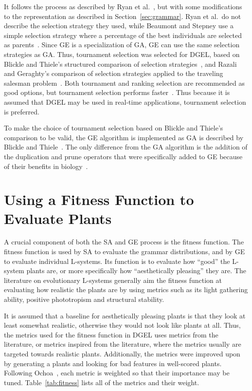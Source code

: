 It follows the process as described by Ryan et al.~\cite{1998Ryan}, but with some modifications to the representation as described in Section~\ref{sec:grammar}.
Ryan et al.\ do not describe the selection strategy they used, while Beaumont and Stepney use a simple selection strategy where a percentage of the best individuals are selected as parents~\cite{2009Beaumont}.
Since GE is a specialization of GA, GE can use the same selection strategies as GA.
Thus, tournament selection was selected for DGEL, based on Blickle and Thiele's structured comparison of selection strategies~\cite{1995Blickle}, and Razali and Geraghty's comparison of selection strategies applied to the traveling salesman problem~\cite{2011Razali}.
Both tournament and ranking selection are recommended as good options, but tournament selection performs faster~\cite{1995Blickle}.
Thus because it is assumed that DGEL may be used in real-time applications, tournament selection is preferred.

To make the choice of tournament selection based on Blickle and Thiele's comparison to be valid, the GE algorithm is implemented as GA is described by Blickle and Thiele~\cite{1995Blickle}.
The only difference from the GA algorithm is the addition of the duplication and prune operators that were specifically added to GE because of their benefits in biology~\cite{1998Ryan}.

\section{Using a Fitness Function to Evaluate Plants}
A crucial component of both the SA and GE process is the fitness function.
The fitness function is used by SA to evaluate the grammar distributions, and by GE to evaluate individual L-systems.
Its function is to evaluate how ``good'' the L-system plants are, or more specifically how ``aesthetically pleasing'' they are.
The literature on evolutionary L-systems generally aim the fitness function at evaluating how realistic the plants are by using metrics such as its light gathering ability, positive phototropism and structural stability.

It is assumed that a baseline for aesthetically pleasing plants is that they look at least somewhat realistic, otherwise they would not look like plants at all.
Thus, the metrics used for the fitness function in DGEL uses metrics from the literature, or metrics inspired from the literature, where the metrics usually are targeted towards realistic plants.
Additionally, the metrics were improved upon by generating a plants and looking for bad features in well-scored plants.
Following Ochoa~\cite{1998Ochoa}, each metric is weighted so that their importance may be tuned.
Table~\ref{tab:fitness} lists all of the metrics and their weight.

